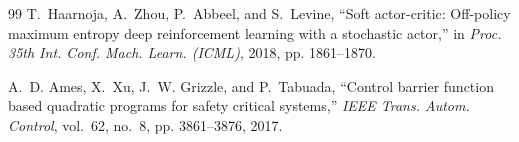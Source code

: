 \documentclass[conference]{IEEEtran}
\begin{document}
\begin{thebibliography}{99}
T.~Haarnoja, A.~Zhou, P.~Abbeel, and S.~Levine, ``Soft actor-critic: Off-policy
maximum entropy deep reinforcement learning with a stochastic actor,'' in
\emph{Proc. 35th Int. Conf. Mach. Learn. (ICML)}, 2018, pp. 1861--1870.

A.~D. Ames, X.~Xu, J.~W. Grizzle, and P.~Tabuada, ``Control barrier function
based quadratic programs for safety critical systems,'' \emph{IEEE Trans. Autom. Control}, vol.~62, no.~8, pp. 3861--3876, 2017.

\end{thebibliography}
\end{document}
